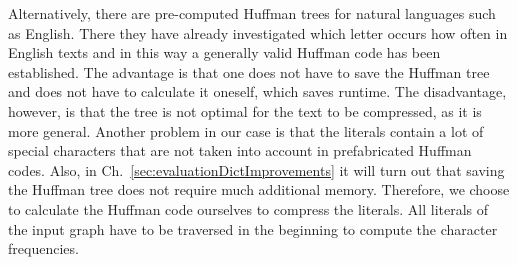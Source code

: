 Alternatively, there are pre-computed Huffman trees for natural languages such as English. There they have already investigated which letter occurs how often in English texts and in this way a generally valid Huffman code has been established. The advantage is that one does not have to save the Huffman tree and does not have to calculate it oneself, which saves runtime. The disadvantage, however, is that the tree is not optimal for the text to be compressed, as it is more general. Another problem in our case is that the literals contain a lot of special characters that are not taken into account in prefabricated Huffman codes. Also, in Ch.~\ref{sec:evaluationDictImprovements} it will turn out that saving the Huffman tree does not require much additional memory. Therefore, we choose to calculate the Huffman code ourselves to compress the literals. All literals of the input graph have to be traversed in the beginning to compute the character frequencies.




















